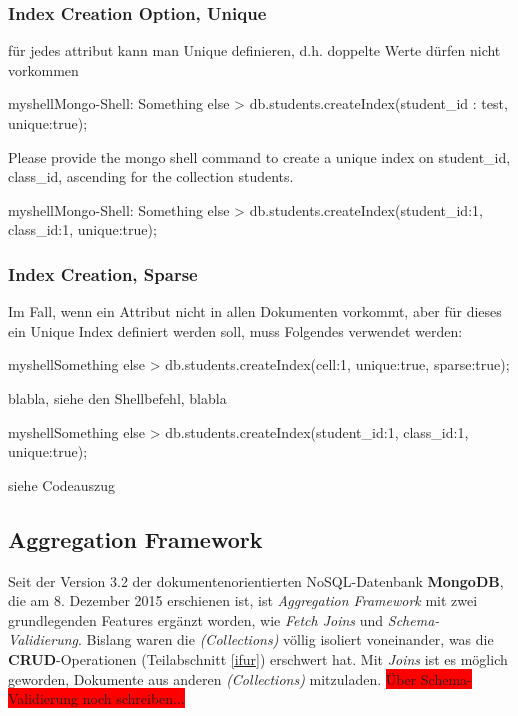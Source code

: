 \subsubsection{Index Creation Option, Unique}
für jedes attribut kann man Unique definieren, d.h. doppelte Werte dürfen nicht vorkommen\newline\newline

\begin{listingsboxShell}[label={lst:X}]{myshell}{Mongo-Shell: Something else}
> db.students.createIndex({student_id : test}, {unique:true});
\end{listingsboxShell}

Please provide the mongo shell command to create a unique index on student\_id, class\_id, ascending for the collection students.

\begin{listingsboxShell}[label={lst:X}]{myshell}{Mongo-Shell: Something else}
> db.students.createIndex({student_id:1, class_id:1}, {unique:true});
\end{listingsboxShell}

\subsubsection{Index Creation, Sparse}

Im Fall, wenn ein Attribut nicht in allen Dokumenten vorkommt, aber für dieses ein Unique Index definiert werden soll, muss Folgendes verwendet werden:

\begin{listingsboxShell}[label={lst:X}]{myshell}{Something else}
> db.students.createIndex({cell:1}, {unique:true, sparse:true});
\end{listingsboxShell}

blabla, siehe den Shellbefehl, blabla

\begin{listingsboxShell}[label={lst:X}]{myshell}{Something else}
> db.students.createIndex({student_id:1, class_id:1}, {unique:true});
\end{listingsboxShell}
siehe Codeauszug

\subsection{Aggregation Framework}\label{aggr}

Seit der Version 3.2 der dokumentenorientierten NoSQL-Datenbank \textbf{MongoDB}, die am 8. Dezember 2015 erschienen ist, ist \textit{Aggregation Framework}  mit zwei grundlegenden Features ergänzt worden, wie \textit{Fetch Joins} und \textit{Schema-Validierung}. Bislang waren die \textit{(Collections)} völlig isoliert voneinander, was die \textbf{CRUD}-Operationen (Teilabschnitt \ref{ifur}) erschwert hat. Mit \textit{Joins} ist es möglich geworden, Dokumente aus anderen \textit{(Collections)} mitzuladen.
\colorbox{red}{Über Schema-Validierung noch schreiben...}

